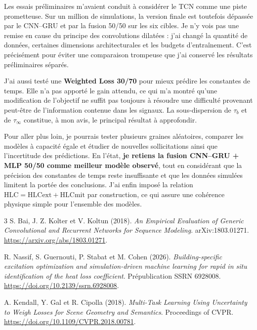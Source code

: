 \documentclass[10pt,a4paper]{article}
\newcommand{\hlc}{\mathrm{HLC}}
\newcommand{\hlcext}{\mathrm{HLCext}}
\newcommand{\hlcmit}{\mathrm{HLCmit}}
\begin{document}
Les essais préliminaires m'avaient conduit à considérer le TCN comme une piste prometteuse. Sur un million de simulations, la version finale est toutefois dépassée par le CNN--GRU et par la fusion 50/50 sur les six cibles. Je n'y vois pas une remise en cause du principe des convolutions dilatées : j'ai changé la quantité de données, certaines dimensions architecturales et les budgets d'entraînement. C'est précisément pour éviter une comparaison trompeuse que j'ai conservé les résultats préliminaires séparés.

J'ai aussi testé une \textbf{Weighted Loss 30/70} pour mieux prédire les constantes de temps. Elle n'a pas apporté le gain attendu, ce qui m'a montré qu'une modification de l'objectif ne suffit pas toujours à résoudre une difficulté provenant peut-être de l'information contenue dans les signaux. La sous-dispersion de $\tau_b$ et de $\tau_\infty$ constitue, à mon avis, le principal résultat à approfondir.

Pour aller plus loin, je pourrais tester plusieurs graines aléatoires, comparer les modèles à capacité égale et étudier de nouvelles sollicitations ainsi que l'incertitude des prédictions. En l'état, \textbf{je retiens la fusion CNN--GRU + MLP 50/50 comme meilleur modèle observé}, tout en considérant que la précision des constantes de temps reste insuffisante et que les données simulées limitent la portée des conclusions. J'ai enfin imposé la relation $\hlc=\hlcext+\hlcmit$ par construction, ce qui assure une cohérence physique simple pour l'ensemble des modèles.

\small
\begin{thebibliography}{3}
 S. Bai, J. Z. Kolter et V. Koltun (2018).
\emph{An Empirical Evaluation of Generic Convolutional and Recurrent Networks for Sequence Modeling}.
arXiv:1803.01271. \url{https://arxiv.org/abs/1803.01271}.

 R. Nassif, S. Guernouti, P. Stabat et M. Cohen (2026).
\emph{Building-specific excitation optimization and simulation-driven machine learning for rapid in situ identification of the heat loss coefficient}.
Prépublication SSRN 6928008. \url{https://doi.org/10.2139/ssrn.6928008}.

 A. Kendall, Y. Gal et R. Cipolla (2018).
\emph{Multi-Task Learning Using Uncertainty to Weigh Losses for Scene Geometry and Semantics}.
Proceedings of CVPR. \url{https://doi.org/10.1109/CVPR.2018.00781}.
\end{thebibliography}
\end{document}
